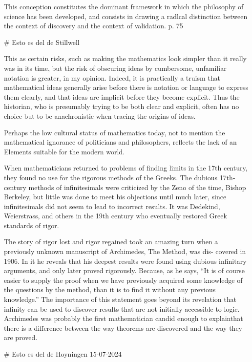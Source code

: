 This conception constitutes the dominant framework in which the philosophy of
science has been developed, and consists in drawing a radlcal distinction
between the context of discovery and the context of validation. p. 75

# Esto es del de Stillwell

This as certain risks, such as making the mathematics look simpler than it
really was in its time, but the risk of obscuring ideas by cumbersome,
unfamiliar notation is greater, in my opinion. Indeed, it is practically a
truism that mathematical ideas generally arise before there is notation or
language to express them clearly, and that ideas are implicit before they become
explicit. Thus the historian, who is presumably trying to be both clear and
explicit, often has no choice but to be anachronistic when tracing the origins
of ideas.

Perhaps the low cultural status of mathematics today, not to mention the
mathematical ignorance of politicians and philosophers, reflects the lack of an
Elements suitable for the modern world.

When mathematicians returned to problems of finding limits in the 17th century,
they found no use for the rigorous methods of the Greeks. The dubious
17th-century methods of infinitesimals were criticized by the Zeno of the time,
Bishop Berkeley, but little was done to meet his objections until much later,
since infinitesimals did not seem to lead to incorrect results. It was Dedekind,
Weierstrass, and others in the 19th century who eventually restored Greek
standards of rigor.

The story of rigor lost and rigor regained took an amazing turn when a
previously unknown manuscript of Archimedes, The Method, was dis- covered in
1906. In it he reveals that his deepest results were found using dubious
infinitary arguments, and only later proved rigorously. Because, as he says, “It
is of course easier to supply the proof when we have previously acquired some
knowledge of the questions by the method, than it is to find it without any
previous knowledge.” The importance of this statement goes beyond its revelation
that infinity can be used to discover results that are not initially accessible
to logic. Archimedes was probably the first  mathematician candid enough to
explainthat there is a difference between the way theorems are discovered and
the way they are proved.



# Esto es del de Hoyningen 15-07-2024

